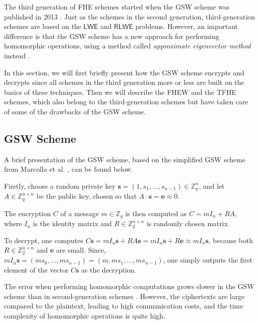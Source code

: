 The third generation of FHE schemes started when the GSW scheme \cite{cite:gsw} was published in 2013  \cite{cite:QianFHE}. Just as the schemes in the second generation, third-generation schemes are based on the $\mathsf{LWE}$ and $\mathsf{RLWE}$ problems. However, an important difference is that the GSW scheme has a new approach for performing homomorphic operations, using a method called \textit{approximate eigenvector method} instead \cite{cite:QianFHE}.

In this section, we will first briefly present how the GSW scheme encrypts and decrypts since all schemes in the third generation more or less are built on the basics of these techniques. Then we will describe the FHEW and the TFHE schemes, which also belong to the third-generation schemes but have taken care of some of the drawbacks of the GSW scheme.

\subsection{GSW Scheme}\label{sec:gsw}

A brief presentation of the GSW scheme, based on the simplified GSW scheme from Marcolla et al. \cite{cite:QianFHE}, can be found below.

Firstly, choose a random private key $\mathbf{s} = (1, s_1, ..., s_{n-1}) \in \mathbb{Z}_q^n$, and let $A \in \mathbb{Z}_q^{n \times n}$ be the public key, chosen so that $A \cdot \mathbf{s} = \mathbf{e} \approx 0$.

The encryption $C$ of a message $m \in \mathbb{Z}_q$ is then computed as $C = mI_n + RA$, where $I_n$ is the identity matrix and $R \in \mathbb{Z}_2^{n \times n}$ is randomly chosen matrix.

To decrypt, one computes $C \mathbf{s} = m I_n \mathbf{s} + RA \mathbf{s} = m I_n \mathbf{s} + R \mathbf{e} \approx m I_n \mathbf{s}$, because both $R \in \mathbb{Z}_2^{n \times n}$ and $\mathbf{e}$ are small. Since, $m I_n \mathbf{s} = (ms_0, ..., ms_{n-1}) = (m, ms_1, ..., ms_{n-1})$, one simply outputs the first element of the vector $C \mathbf{s}$ as the decryption.

The error when performing homomorphic computations grows slower in the GSW scheme than in second-generation schemes \cite{cite:QianFHE}. However, the ciphertexts are large compared to the plaintext, leading to high communication costs, and the time complexity of homomorphic operations is quite high.


